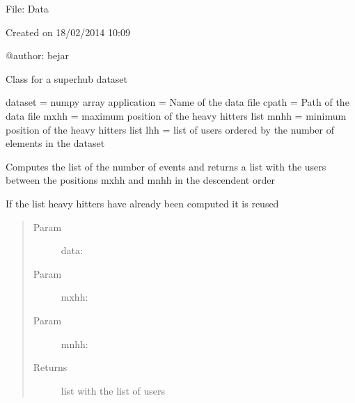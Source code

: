 \documentclass[letterpaper,10pt,english]{sphinxmanual}
\begin{document}
File: Data

Created on 18/02/2014 10:09

@author: bejar

\begin{fulllineitems}
\label{index:SuperHub.Data.Data}
Class for a superhub dataset

dataset = numpy array
application = Name of the data file
cpath = Path of the data file
mxhh = maximum position of the heavy hitters list
mnhh = minimum position of the heavy hitters list
lhh = list of users ordered by the number of elements in the dataset

\begin{fulllineitems}
\label{index:SuperHub.Data.Data.application}
\end{fulllineitems}


\begin{fulllineitems}
\label{index:SuperHub.Data.Data.compute_heavy_hitters}
Computes the list of the number of events
and returns a list with the users between the
positions mxhh and mnhh in the descendent order

If the list heavy hitters have already been computed it is reused
\begin{quote}\begin{description}
\item[{Param }] \leavevmode
data:

\item[{Param }] \leavevmode
mxhh:

\item[{Param }] \leavevmode
mnhh:

\item[{Returns}] \leavevmode
list with the list of users

\end{description}\end{quote}

\end{fulllineitems}



\end{fulllineitems}
\end{document}
